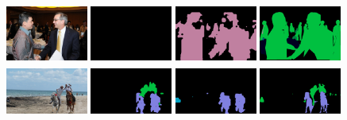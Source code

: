 \begin{figure}[p!]
  {\includegraphics[width=0.24\textwidth, height=1.8cm]{figures/experiments/coco/image/0042.jpg}}
  {\includegraphics[width=0.24\textwidth, height=1.8cm]{figures/experiments/coco/orgckpt/0042.png}}
  {\includegraphics[width=0.24\textwidth, height=1.8cm]{figures/experiments/coco/nonnoisy/0042.png}}
  {\includegraphics[width=0.24\textwidth, height=1.8cm]{figures/experiments/coco/gt/000000004134_instanceTrainIds.png}}
  {\includegraphics[width=0.24\textwidth, height=1.8cm]{figures/experiments/coco/image/0072.jpg}}
  {\includegraphics[width=0.24\textwidth, height=1.8cm]{figures/experiments/coco/orgckpt/0072.png}}
  {\includegraphics[width=0.24\textwidth, height=1.8cm]{figures/experiments/coco/nonnoisy/0072.png}}
  {\includegraphics[width=0.24\textwidth, height=1.8cm]{figures/experiments/coco/gt/000000007281_instanceTrainIds.png}}
  

\end{figure}
